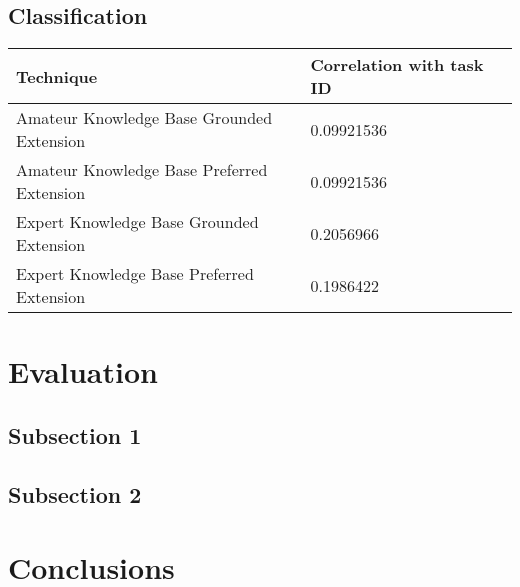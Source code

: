 \subsection{Classification}


\begin{center}
    \begin{tabular}{ | l | l | l |}
    \hline
    Technique & Correlation with task ID \\ \hline
    Amateur Knowledge Base Grounded Extension & 0.09921536\\ \hline
    Amateur Knowledge Base Preferred Extension & 0.09921536\\ \hline
    Expert Knowledge Base Grounded Extension & 0.2056966\\ \hline
    Expert Knowledge Base Preferred Extension & 0.1986422\\ \hline
    \end{tabular}
\end{center}




\section{Evaluation}


\subsection{Subsection 1}


\subsection{Subsection 2}



\section{Conclusions}

